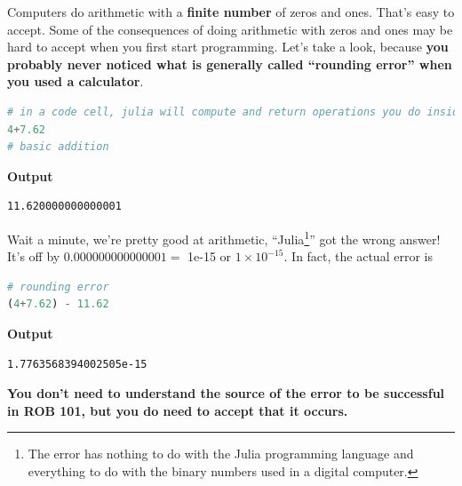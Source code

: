 Computers do arithmetic with a \textbf{finite number} of zeros and ones.  That's easy to accept. Some of the consequences of doing arithmetic with zeros and ones may be hard to accept when you first start programming. Let's take a look, because \textbf{you probably never noticed what is generally called ``rounding error'' when you used a calculator}. 

\begin{lstlisting}[language=Julia,style=mystyle]
# in a code cell, julia will compute and return operations you do inside it
4+7.62
# basic addition
\end{lstlisting}
\textbf{Output} 
\begin{verbatim}
11.620000000000001
\end{verbatim}
Wait a minute, we're pretty good at arithmetic, ``Julia\footnote{The error has nothing to do with the Julia programming language and everything to do with the binary numbers used in a digital computer.}'' got the wrong answer! It's off by $0.000000000000001 =$ 1e-15 or $1 \times 10^{-15}$. In fact, the actual error is 
\begin{lstlisting}[language=Julia,style=mystyle]
# rounding error
(4+7.62) - 11.62
\end{lstlisting}
\textbf{Output} 
\begin{verbatim}
1.7763568394002505e-15
\end{verbatim}
\textbf{You don't need to understand the source of the error to be successful in ROB 101, but you do need to accept that it occurs.} \\

